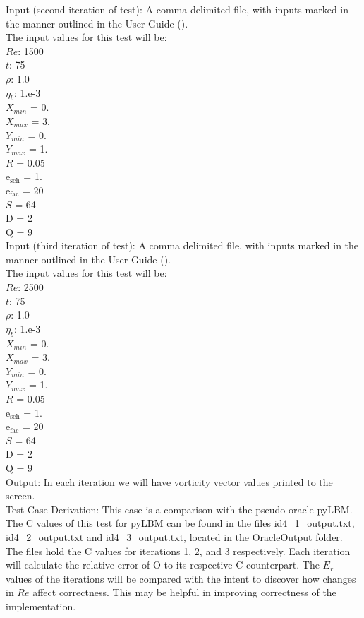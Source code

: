 \documentclass[12pt, titlepage]{article}
\begin{document}
\begin{enumerate}
Input (second iteration of test): A comma delimited file, with inputs marked in
the manner outlined in the User Guide (\citet{LBM_UserGuide_PM}).\\The input
values for this test will be:\\
$Re$: 1500\\
$t$: 75\\
$\rho$: 1.0\\
$\eta_b$: 1.e-3\\
$X_{min}$ = 0.\\
$X_{max}$ = 3.\\
$Y_{min}$ = 0.\\
$Y_{max}$ = 1.\\
$R$ = 0.05\\
$\mathrm{e_{sch}}$ = 1.\\
$\mathrm{e_{fac}}$ = 20\\
$S$ = 64\\
$\mathrm{D}$ = 2\\
$\mathrm{Q}$ = 9\\

Input (third iteration of test): A comma delimited file, with inputs marked in
the manner outlined in the User Guide (\citet{LBM_UserGuide_PM}).\\The input
values for this test will be:\\
$Re$: 2500\\
$t$: 75\\
$\rho$: 1.0\\
$\eta_b$: 1.e-3\\
$X_{min}$ = 0.\\
$X_{max}$ = 3.\\
$Y_{min}$ = 0.\\
$Y_{max}$ = 1.\\
$R$ = 0.05\\
$\mathrm{e_{sch}}$ = 1.\\
$\mathrm{e_{fac}}$ = 20\\
$S$ = 64\\
$\mathrm{D}$ = 2\\
$\mathrm{Q}$ = 9\\

Output: In each iteration we will have vorticity vector values printed to the screen.\\

Test Case Derivation: This case is a comparison with the pseudo-oracle
pyLBM. The C values of this test for pyLBM can be found in the files
id4\_1\_output.txt, id4\_2\_output.txt and id4\_3\_output.txt, located in the
OracleOutput folder. The files hold the C values for iterations 1, 2, and 3
respectively. Each iteration will calculate the relative error of O to its
respective C counterpart. The $E_r$ values of the iterations will be compared
with the intent to discover how changes in $Re$ affect correctness. This may be
helpful in improving correctness of the implementation.\\


\end{enumerate}
\end{document}
